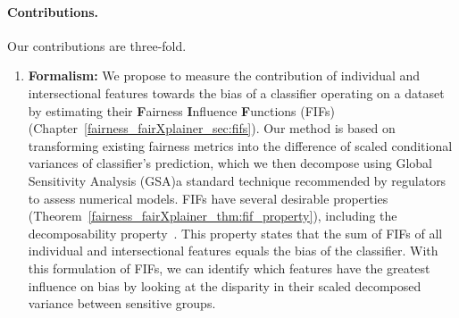 \paragraph{Contributions.}  Our contributions are three-fold.

\begin{enumerate}
	
	\item \textbf{Formalism:} We propose to measure the contribution of individual and intersectional features towards the bias of a classifier operating on a dataset by estimating their \textbf{F}airness \textbf{I}nfluence \textbf{F}unctions (FIFs) (Chapter~\ref{fairness_fairXplainer_sec:fifs}). Our method is based on transforming existing fairness metrics into the difference of scaled conditional variances of classifier's prediction, which we then decompose using Global Sensitivity Analysis (GSA)\textemdash a standard technique recommended by regulators to assess numerical models\cite{eu,usepa}. FIFs have several desirable properties (Theorem~\ref{fairness_fairXplainer_thm:fif_property}), including the decomposability property~\cite{begley2020explainability,lundberg2020explaining}. This property states that the sum of FIFs of all individual and intersectional features equals the bias of the classifier. With this formulation of FIFs, we can identify which features have the greatest influence on bias by looking at the disparity in their scaled decomposed variance between sensitive groups.
	
	

\end{enumerate}
